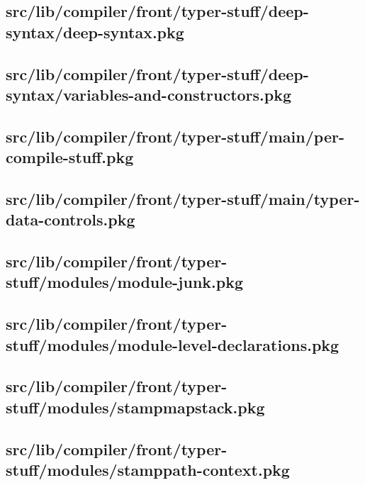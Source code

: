 \subsection{src/lib/compiler/front/typer-stuff/deep-syntax/deep-syntax.pkg}


\subsection{src/lib/compiler/front/typer-stuff/deep-syntax/variables-and-constructors.pkg}


\subsection{src/lib/compiler/front/typer-stuff/main/per-compile-stuff.pkg}


\subsection{src/lib/compiler/front/typer-stuff/main/typer-data-controls.pkg}


\subsection{src/lib/compiler/front/typer-stuff/modules/module-junk.pkg}


\subsection{src/lib/compiler/front/typer-stuff/modules/module-level-declarations.pkg}


\subsection{src/lib/compiler/front/typer-stuff/modules/stampmapstack.pkg}


\subsection{src/lib/compiler/front/typer-stuff/modules/stamppath-context.pkg}


